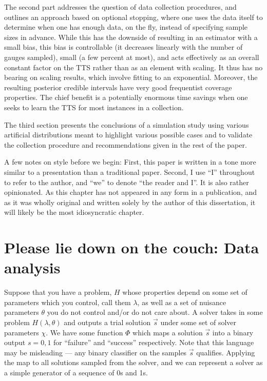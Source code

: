 The second part addresses the question of data collection procedures, and outlines an approach based on optional stopping, where one uses the data itself to determine when one has enough data, on the fly, instead of specifying sample sizes in advance. While this has the downside of resulting in an estimator with a small bias, this bias is controllable (it decreases linearly with the number of gauges sampled), small (a few percent at most), and acts effectively as an overall constant factor on the TTS rather than as an element with scaling. It thus has no bearing on scaling results, which involve fitting to an exponential. Moreover, the resulting posterior credible intervals have very good frequentist coverage properties. The chief benefit is a potentially enormous time savings when one seeks to learn the TTS for most instances in a collection.

The third section presents the conclusions of a simulation study using various artificial distributions meant to highlight various possible cases and to validate the collection procedure and recommendations given in the rest of the paper.

A few notes on style before we begin: First, this paper is written in a tone more similar to a presentation than a traditional paper. Second, I use ``I'' throughout to refer to the author, and ``we'' to denote ``the reader and I''. It is also rather opinionated. As this chapter has not appeared in any form in a publication, and as it was wholly original and written solely by the author of this dissertation, it will likely be the most idiosyncratic chapter.

\section{Please lie down on the couch: Data analysis}
\label{sec:bp}
Suppose that you have a problem, $H$ whose properties depend on some set of parameters which you control, call them $\lambda$, as well as a set of nuisance parameters $\theta$ you do not control and/or do not care about. A solver takes in some problem $H(\lambda,\theta)$ and outputs a trial solution $\vec{s}$ under some set of solver parameters $\chi$. We have some function $\Phi$ which maps a solution $\vec{s}$ into a binary output $s=0,1$ for ``failure'' and ``success'' respectively. Note that this language may be misleading --- any binary classifier on the samples $\vec{s}$ qualifies. Applying the map to all solutions sampled from the solver, and we can represent a solver as a simple generator of a sequence of 0s and 1s.

